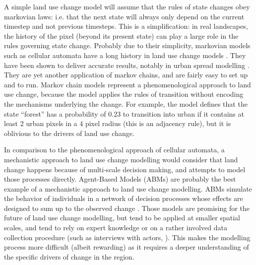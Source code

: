A simple land use change model will assume that the rules of state changes obey markovian laws: i.e. that the next state will always only depend on the current timestep and not previous timesteps. This is a simplification: in real landscapes, the history of the pixel (beyond its present state) can play a large role in the rules governing state change. Probably due to their simplicity, markovian models such as cellular automata have a long history in land use change models \citep{agarwal_review_2002}. They have been shown to deliver accurate results, notably in urban spread modelling \citep{soares-filho_dinamicastochastic_2002, jokar_arsanjani_integration_2013, iacono_markov_2015}. They are yet another application of markov chains, and are fairly easy to set up and to run. Markov chain models represent a phenomenological approach to land use change, because the model applies the rules of transition without encoding the mechanisms underlying the  change. For example, the model defines that the state “forest” has a probability of 0.23 to transition into urban if it contains at least 2 urban pixels in a 4 pixel radius (this is an adjacency rule), but it is oblivious to the drivers of land use change.

In comparison to the phenomenological approach of cellular automata, a mechanistic approach to land use change modelling would consider that land change happens because of multi-scale decision making, and attempts to model those processes directly. Agent-Based Models (ABMs) are probably the best example of a mechanistic approach to land use change modelling. ABMs simulate the behavior of individuals in a network of decision processes whose effects are designed to sum up to the observed change \citep{parker_agent-based_2002, filatova_spatial_2013}. Those models are promising for the future of land use change modelling, but tend to be applied at smaller spatial scales, and tend to rely on expert knowledge or on a rather involved data collection procedure (such as interviews with actors, \cite{taylor_agent-based_2016}). This makes the modelling process more difficult (albeit rewarding) as it requires a deeper understanding of the specific drivers of change in the region.

